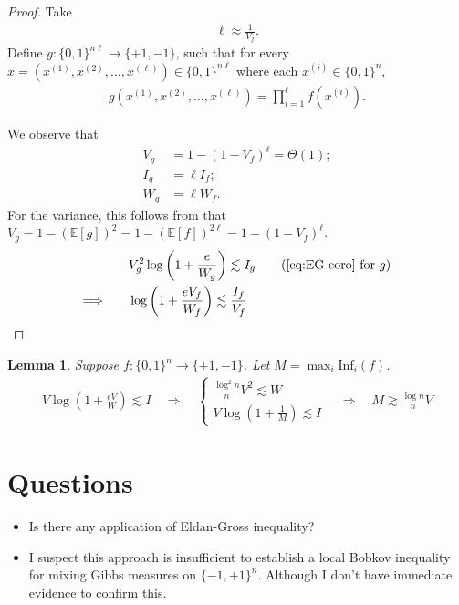 \documentclass[11pt]{article}
\theoremstyle{plain}
\newtheorem{lemma}[theorem]{Lemma}
\theoremstyle{definition}
\theoremstyle{remark}
\begin{document}
\begin{proof}
    Take 
    \begin{align*}
        \ell \approx \frac{1}{V_f}.
    \end{align*}
    Define $g: \{0,1\}^{n\ell} \to \{+1, -1\}$, such that for every $x = (x^{(1)}, x^{(2)}, \dots, x^{(\ell)}) \in \{0,1\}^{n\ell}$ where each $x^{(i)} \in \{0,1\}^n$, 
    \begin{align*}
        g(x^{(1)}, x^{(2)}, \dots, x^{(\ell)}) = \prod_{i=1}^\ell f(x^{(i)}).
    \end{align*}

    We observe that
    \begin{align*}
        V_g &= 1 - (1 - V_f)^\ell = \Theta(1); \\
        I_g &= \ell I_f; \\
        W_g &= \ell W_f.
    \end{align*}
    For the variance, this follows from that $V_g = 1 - (\mathbb{E}[g])^2 = 1 - (\mathbb{E}[f])^{2\ell} = 1 - (1 - V_f)^\ell$.
    \begin{align*}
        &V_g^2 \log\left(1 + \frac{e}{W_g}\right) \lesssim I_g \tag{\cref{eq:EG-coro} for $g$}\\
        \Longrightarrow \qquad
        &\log\left(1 + \frac{e V_f}{W_f}\right) \lesssim \frac{I_f}{V_f} 
    \end{align*}
\end{proof}

\begin{lemma}
    Suppose $f: \{0,1\}^n \to \{+1, -1\}$.
    Let $M = \max_i \mathrm{Inf}_i(f)$.
    \begin{align}
        V \log\left(1 + \frac{eV}{W}\right) \lesssim I 
        \quad\Longrightarrow\quad
        \begin{cases}
            \frac{\log^2 n}{n} V^2 \lesssim W \\
            V \log\left(1 + \frac{1}{M}\right) \lesssim I 
        \end{cases} 
        \quad\Longrightarrow\quad
        M \gtrsim \frac{\log n}{n} V \tag{KKL}
    \end{align}
\end{lemma}

\section*{Questions}
\begin{itemize}
\item Is there any application of Eldan-Gross inequality?
\item I suspect this approach is insufficient to establish a local Bobkov inequality for mixing Gibbs measures on $\{-1,+1\}^n$. Although I don’t have immediate evidence to confirm this.
\end{itemize}
\end{document}
